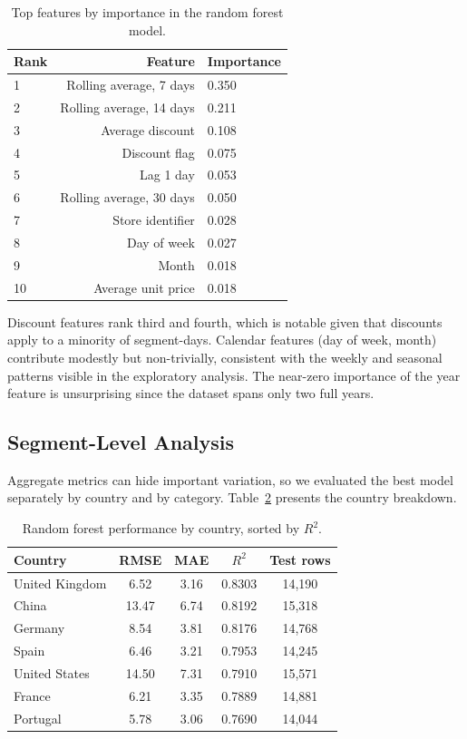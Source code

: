 \documentclass[11pt,a4paper]{article}
\begin{document}
\begin{table}[h]
\centering
\caption{Top features by importance in the random forest model.}
\label{tab:importance}
\begin{tabular}{lrl}
\toprule
Rank & Feature & Importance \\
\midrule
1 & Rolling average, 7 days & 0.350 \\
2 & Rolling average, 14 days & 0.211 \\
3 & Average discount & 0.108 \\
4 & Discount flag & 0.075 \\
5 & Lag 1 day & 0.053 \\
6 & Rolling average, 30 days & 0.050 \\
7 & Store identifier & 0.028 \\
8 & Day of week & 0.027 \\
9 & Month & 0.018 \\
10 & Average unit price & 0.018 \\
\bottomrule
\end{tabular}
\end{table}

Discount features rank third and fourth, which is notable given that discounts apply to a minority of segment-days. Calendar features (day of week, month) contribute modestly but non-trivially, consistent with the weekly and seasonal patterns visible in the exploratory analysis. The near-zero importance of the year feature is unsurprising since the dataset spans only two full years.

\subsection{Segment-Level Analysis}

Aggregate metrics can hide important variation, so we evaluated the best model separately by country and by category. Table~\ref{tab:segments} presents the country breakdown.

\begin{table}[h]
\centering
\caption{Random forest performance by country, sorted by $R^2$.}
\label{tab:segments}
\begin{tabular}{lcccc}
\toprule
Country & RMSE & MAE & $R^2$ & Test rows \\
\midrule
United Kingdom & 6.52 & 3.16 & 0.8303 & 14{,}190 \\
China & 13.47 & 6.74 & 0.8192 & 15{,}318 \\
Germany & 8.54 & 3.81 & 0.8176 & 14{,}768 \\
Spain & 6.46 & 3.21 & 0.7953 & 14{,}245 \\
United States & 14.50 & 7.31 & 0.7910 & 15{,}571 \\
France & 6.21 & 3.35 & 0.7889 & 14{,}881 \\
Portugal & 5.78 & 3.06 & 0.7690 & 14{,}044 \\
\bottomrule
\end{tabular}
\end{table}
\end{document}
